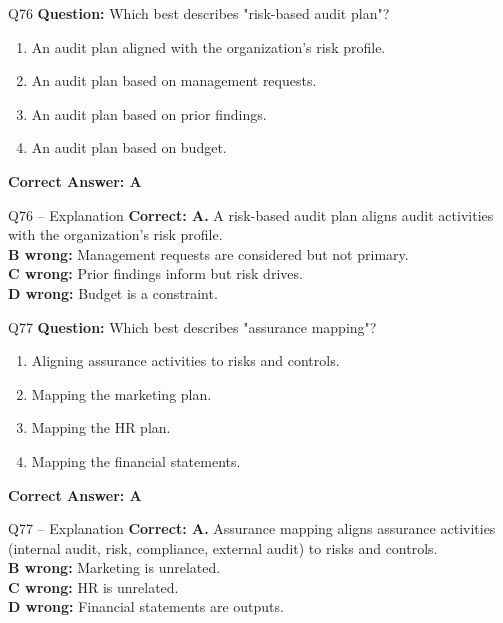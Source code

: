 \documentclass[aspectratio=169,10pt]{beamer}
\begin{document}
	\begin{frame}[t]{Q76}
		\small
		\textbf{Question:} Which best describes "risk-based audit plan"?
		\begin{enumerate}[label=\Alph*.,itemsep=1pt,topsep=2pt]
			\item An audit plan aligned with the organization's risk profile.
			\item An audit plan based on management requests.
			\item An audit plan based on prior findings.
			\item An audit plan based on budget.
		\end{enumerate}
		\vspace{4pt}
		\textbf{Correct Answer: A}
	\end{frame}
	
	\begin{frame}[t]{Q76 -- Explanation}
		\small
		\textbf{Correct: A.} A risk-based audit plan aligns audit activities with the organization's risk profile. \\[4pt]
		\textbf{B wrong:} Management requests are considered but not primary. \\[2pt]
		\textbf{C wrong:} Prior findings inform but risk drives. \\[2pt]
		\textbf{D wrong:} Budget is a constraint.
	\end{frame}
	
	\begin{frame}[t]{Q77}
		\small
		\textbf{Question:} Which best describes "assurance mapping"?
		\begin{enumerate}[label=\Alph*.,itemsep=1pt,topsep=2pt]
			\item Aligning assurance activities to risks and controls.
			\item Mapping the marketing plan.
			\item Mapping the HR plan.
			\item Mapping the financial statements.
		\end{enumerate}
		\vspace{4pt}
		\textbf{Correct Answer: A}
	\end{frame}
	
	\begin{frame}[t]{Q77 -- Explanation}
		\small
		\textbf{Correct: A.} Assurance mapping aligns assurance activities (internal audit, risk, compliance, external audit) to risks and controls. \\[4pt]
		\textbf{B wrong:} Marketing is unrelated. \\[2pt]
		\textbf{C wrong:} HR is unrelated. \\[2pt]
		\textbf{D wrong:} Financial statements are outputs.
	\end{frame}
	
\end{document}
